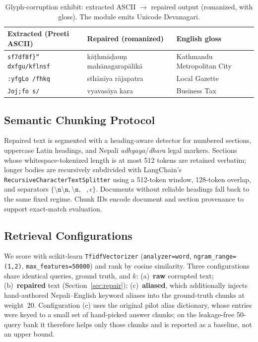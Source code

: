 \documentclass[journal]{IEEEtran}
\newcommand{\nqueries}{50}
\begin{document}
\begin{table}[t]
\caption{Glyph-corruption exhibit: extracted ASCII $\rightarrow$ repaired output (romanized, with gloss). The module emits Unicode Devanagari.}
\label{tab:exhibit}
\centering
\footnotesize
\begin{tabular}{p{2.3cm}p{2.1cm}p{2.5cm}}
\toprule
\textbf{Extracted (Preeti ASCII)} & \textbf{Repaired (romanized)} & \textbf{English gloss} \\
\midrule
\texttt{sf7df8f\}“ dxfgu/kflnsf} & k\=a\d{t}hm\=a\d{d}au\d{m} mah\=anagarap\=alik\=a & Kathmandu Metropolitan City \\
\texttt{:yfgLo /fhkq} & sth\=an\=iya r\=ajapatra & Local Gazette \\
\texttt{Joj;fo s/} & vyavas\=aya kara & Business Tax \\
\bottomrule
\end{tabular}
\end{table}

\subsection{Semantic Chunking Protocol}
Repaired text is segmented with a heading-aware detector for numbered sections, uppercase Latin headings, and Nepali \emph{adhyaya}/\emph{dhara} legal markers. Sections whose whitespace-tokenized length is at most 512 tokens are retained verbatim; longer bodies are recursively subdivided with LangChain's \texttt{RecursiveCharacterTextSplitter} using a 512-token window, 128-token overlap, and separators $\{\texttt{\textbackslash n\textbackslash n},\texttt{\textbackslash n},\texttt{ },\epsilon\}$. Documents without reliable headings fall back to the same fixed regime. Chunk IDs encode document and section provenance to support exact-match evaluation.

\subsection{Retrieval Configurations}
\label{sec:retrieval-config}
We score with scikit-learn \texttt{TfidfVectorizer} (\texttt{analyzer=word}, \texttt{ngram\_range=(1,2)}, \texttt{max\_features=50000}) and rank by cosine similarity. Three configurations share identical queries, ground truth, and $k$:
(a)~\textbf{raw} corrupted text; (b)~\textbf{repaired} text (Section~\ref{sec:repair}); (c)~\textbf{aliased}, which additionally injects hand-authored Nepali--English keyword aliases into the ground-truth chunks at weight~20. Configuration (c) uses the original pilot alias dictionary, whose entries were keyed to a small set of hand-picked answer chunks; on the leakage-free \nqueries{}-query bank it therefore helps only those chunks and is reported as a baseline, not an upper bound.
\end{document}
